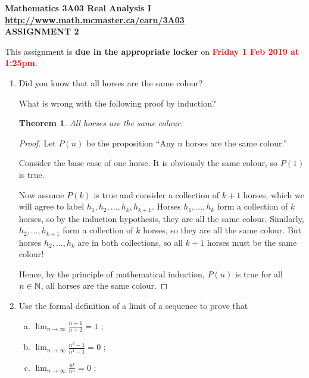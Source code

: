 \documentclass[12pt]{article}
\newtheorem{theorem}{Theorem}
\begin{document}
\begin{center}
{\bf Mathematics 3A03 Real Analysis I\\
  \smallskip
  \url{http://www.math.mcmaster.ca/earn/3A03}\\
 ASSIGNMENT 2}

\bigskip

This assignment is {\bfseries\color{red} due in the appropriate locker} on
\textcolor{red}{\bf Friday 1 Feb 2019 at 1:25pm}.
\end{center}

\bigskip

\begin{enumerate}

\item Did you know that all horses are the same colour?

  What is wrong with the following proof by induction?

  \begin{theorem}
    All horses are the same colour.
  \end{theorem}

  \begin{proof}
    Let $P(n)$ be the proposition ``Any $n$ horses are the same colour.''

    Consider the base case of one horse.  It is obviously the same
    colour, so $P(1)$ is true.

    Now assume $P(k)$ is true and consider a collection of $k+1$
    horses, which we will agree to label $h_1,h_2,\ldots,h_k,h_{k+1}$.
    Horses $h_1,\ldots,h_k$ form a collection of $k$ horses, so by the
    induction hypothesis, they are all the same colour.  Similarly,
    $h_2,\ldots,h_{k+1}$ form a collection of $k$ horses, so they are
    all the same colour.  But horses $h_2,\ldots,h_k$ are in both
    collections, so all $k+1$ horses must be the same colour!

    Hence, by the principle of mathematical induction, $P(n)$ is true
    for all $n\in\mathbb{N}$, \ie all horses are the same colour.
  \end{proof}

\item Use the formal definition of a limit of a sequence to prove that
  \begin{enumerate}[(a)]
  \item $\displaystyle\lim_{n\to\infty} \frac{n+1}{n+2} = 1$ ;
  \item $\displaystyle\lim_{n\to\infty} \frac{n^3-1}{n^4-1} = 0$ ;
  \item $\displaystyle\lim_{n\to\infty} \frac{n!}{n^n} = 0$ ;
  \end{enumerate}


\end{enumerate}
\end{document}
